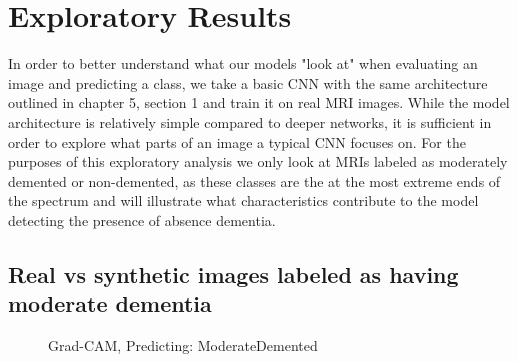 \documentclass [MAS] {uclathes}
\begin{document}
\section{Exploratory Results}
In order to better understand what our models "look at" when evaluating an image and predicting a class, we take a basic 
CNN with the same architecture outlined in chapter 5, section 1 and train it on real MRI images. While the model 
architecture is relatively simple compared to deeper networks, it is sufficient in order to explore what parts of an 
image a typical CNN focuses on. For the purposes of this exploratory analysis we only look at MRIs labeled as moderately 
demented or non-demented, as these classes are the at the most extreme ends of the spectrum and will illustrate what 
characteristics contribute to the model detecting the presence of absence dementia.

\subsection{Real vs synthetic images labeled as having moderate dementia}

\begin{figure}[H]
    \centering
    \hspace{0.001\textwidth}
    \caption{Grad-CAM, Predicting: ModerateDemented}
\end{figure}
\end{document}
